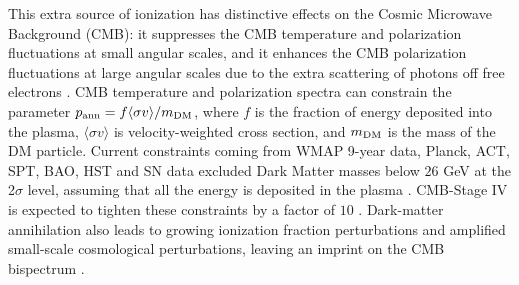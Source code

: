 This extra source of ionization has distinctive effects on the Cosmic Microwave Background (CMB): it suppresses the CMB temperature and polarization fluctuations at small angular scales, and it enhances the CMB polarization fluctuations at large angular scales due to the extra scattering of photons off free electrons \cite{Chen:2003gz,Padmanabhan:2005es}.
CMB temperature and polarization spectra can constrain the parameter
$p_{\rm ann}=f\langle\sigma v\rangle/m_{\rm DM}$, where $f$ is the fraction of energy
deposited into the plasma, $\langle\sigma v\rangle$ is velocity-weighted
cross section, and $m_{\rm DM}$ is the mass of the DM particle.
Current constraints coming from WMAP 9-year data,
Planck, ACT, SPT, BAO, HST and SN data excluded
Dark Matter masses below $26$ GeV at the 2$\sigma$ level, assuming that
all the energy is deposited in the plasma \cite{Madhavacheril:2013cna}. CMB-Stage IV is expected to tighten these constraints by a factor of $10$ \cite{Wu:2014hta}. Dark-matter annihilation also leads to growing ionization fraction perturbations and amplified small-scale cosmological perturbations, leaving an imprint on the CMB bispectrum \cite{Dvorkin:2013cga}.

%
